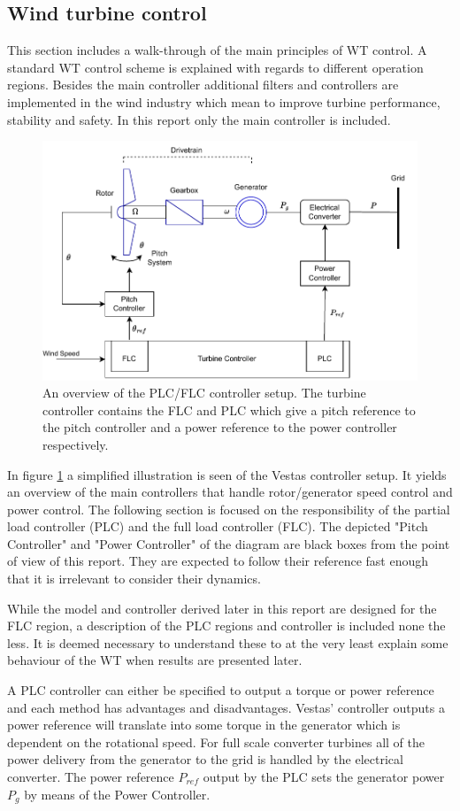 \subsection{Wind turbine control} \label{sec:theory_ctrl}
This section includes a walk-through of the main principles of WT control. A standard WT control scheme is explained with regards to different operation regions. Besides the main controller additional filters and controllers are implemented in the wind industry which mean to improve turbine performance, stability and safety. In this report only the main controller is included.
\begin{figure}[ht]
	\centering
	\includegraphics[width=0.7\linewidth]{Graphics/PLC_PI.pdf}
	\caption{An overview of the PLC/FLC controller setup. The turbine controller contains the FLC and PLC which give a pitch reference to the pitch controller and a power reference to the power controller respectively.}
	\label{fig:controller_overview}
\end{figure}
In figure \cref{fig:controller_overview} a simplified illustration is seen of the Vestas controller setup. It yields an overview of the main controllers that handle rotor/generator speed control and power control. The following section is focused on the responsibility of the partial load controller (PLC) and the full load controller (FLC). The depicted "Pitch Controller" and "Power Controller" of the diagram are black boxes from the point of view of this report. They are expected to follow their reference fast enough that it is irrelevant to consider their dynamics.

While the model and controller derived later in this report are designed for the FLC region, a description of the PLC regions and controller is included none the less. It is deemed necessary to understand these to at the very least explain some behaviour of the WT when results are presented later.

A PLC controller can either be specified to output a torque or power reference and each method has advantages and disadvantages. Vestas' controller outputs a power reference will translate into some torque in the generator which is dependent on the rotational speed. For full scale converter turbines all of the power delivery from the generator to the grid is handled by the electrical converter. The power reference $ P_{ref} $ output by the PLC sets the generator power $ P_g $ by means of the Power Controller.


